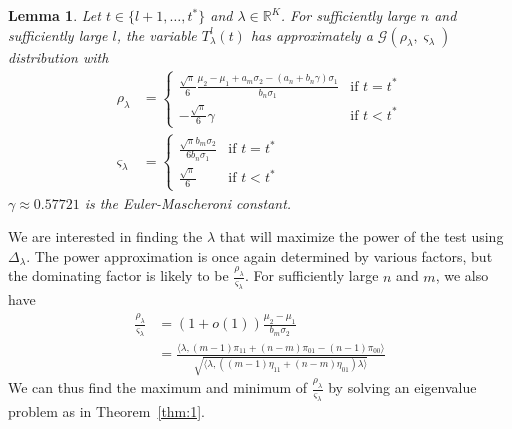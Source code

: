 \documentclass[draftcls]{IEEEtran}
\newtheorem{lemma}[theorem]{Lemma}
\theoremstyle{definition}
\begin{document}
\begin{lemma}
  \label{lem:2}
  Let $t \in \{l+1, \dots, t^{*}\}$ and $\lambda \in
  \mathbb{R}^{K}$. For sufficiently large $n$ and sufficiently large
  $l$, the variable $T_{\lambda}^{l}(t)$ has approximately a
  $\mathcal{G}(\rho_{\lambda}, \varsigma_{\lambda})$ distribution with
\begin{align}
  \label{eq:13}
  \rho_{\lambda} &= \begin{cases}
    \frac{\sqrt{\pi}}{6} \frac{\mu_2 - \mu_1 + a_m\sigma_2 - (a_n + b_n
      \gamma)\sigma_1}{b_n \sigma_1} & \text{if $t =
        t^{*}$} \\
      - \frac{ \sqrt{\pi}}{6} \gamma & \text{if $t < t^{*}$}
  \end{cases}\\
  \varsigma_{\lambda} &= \begin{cases}
    \frac{\sqrt{\pi} b_m \sigma_2}{6 b_n \sigma_1} & \text{if $t =
      t^{*}$} \\
    \frac{\sqrt{\pi}}{6} & \text{if $t < t^{*}$}
    \end{cases}
\end{align}
$\gamma \approx 0.57721$ is the Euler-Mascheroni constant.
\end{lemma}
We are interested in finding the $\lambda$ that will maximize the
power of the test using $\Delta_{\lambda}$. The power approximation is
once again determined by various factors, but the dominating factor is
likely to be $\tfrac{\rho_\lambda}{\varsigma_\lambda}$. For sufficiently large $n$
and $m$, we also have
\begin{equation*}
  \begin{split}
  \frac{\rho_\lambda}{\varsigma_\lambda} &= (1 + o(1)) \frac{\mu_2 - \mu_1}{b_m
    \sigma_ 2} \\ &= \frac{\langle \lambda, (m-1)\pi_{11} + (n-m)\pi_{01} -
    (n-1) \pi_{00} \rangle}{\sqrt{\langle \lambda, ((m-1) \eta_{11} +
    (n-m)\eta_{01}) \lambda \rangle}}
  \end{split}
\end{equation*}
We can thus find the maximum and minimum of
$\tfrac{\rho_{\lambda}}{\varsigma_{\lambda}}$ by solving an 
eigenvalue problem as in Theorem~\ref{thm:1}. 
\end{document}
